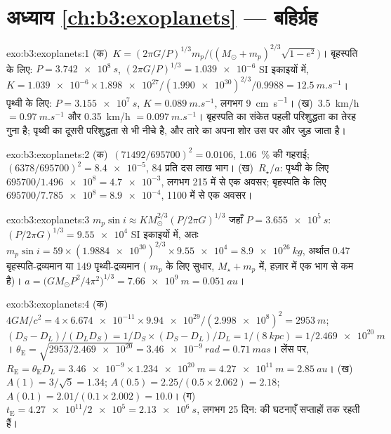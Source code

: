\section*{अध्याय \ref{ch:b3:exoplanets} --- बहिर्ग्रह}

\begin{solution}{exo:b3:exoplanets:1}
(क)~$K = (2\pi G/P)^{1/3}m_p/\bigl((M_\odot + m_p)^{2/3}\sqrt{1 - e^2}\bigr)$।
बृहस्पति के लिए: $P = \qty{3.742e8}{s}$, $(2\pi G/P)^{1/3} = \num{1.039e-6}$ SI
इकाइयों में, $K = \num{1.039e-6}\times\num{1.898e27}/(\num{1.990e30})^{2/3}/0.9988
= \qty{12.5}{m.s^{-1}}$। पृथ्वी के लिए: $P = \qty{3.155e7}{s}$, $K =
\qty{0.089}{m.s^{-1}}$, लगभग \qty{9}{cm.s^{-1}}। (ख)~\qty{3.5}{km/h} $=
\qty{0.97}{m.s^{-1}}$ और \qty{0.35}{km/h} $= \qty{0.097}{m.s^{-1}}$।
बृहस्पति का संकेत पहली परिशुद्धता का तेरह गुना है; पृथ्वी का
दूसरी परिशुद्धता से भी नीचे है, और तारे का अपना शोर उस पर और जुड़ जाता है।
\end{solution}

\begin{solution}{exo:b3:exoplanets:2}
(क)~$(71492/695700)^2 = \num{0.0106}$, \qty{1.06}{\percent} की गहराई;
$(6378/695700)^2 = \num{8.4e-5}$, 84 प्रति दस लाख भाग। (ख)~$R_\star/a$:
पृथ्वी के लिए $695700/\num{1.496e8} = \num{4.7e-3}$, लगभग 215 में से एक अवसर;
बृहस्पति के लिए $695700/\num{7.785e8} = \num{8.9e-4}$, 1100 में से एक अवसर।
\end{solution}

\begin{solution}{exo:b3:exoplanets:3}
$m_p\sin i \approx K M_\odot^{2/3}(P/2\pi G)^{1/3}$ जहाँ $P =
\qty{3.655e5}{s}$: $(P/2\pi G)^{1/3} = \num{9.55e4}$ SI इकाइयों में, अतः $m_p
\sin i = 59\times(\num{1.9884e30})^{2/3}\times\num{9.55e4} =
\qty{8.9e26}{kg}$, अर्थात 0.47 बृहस्पति-द्रव्यमान या 149 पृथ्वी-द्रव्यमान (
$m_p$ के लिए सुधार, $M_\star + m_p$ में, हज़ार में एक भाग से कम है)।
$a = \bigl(GM_\odot P^2/4\pi^2\bigr)^{1/3} = \qty{7.66e9}{m} =
\qty{0.051}{au}$।
\end{solution}

\begin{solution}{exo:b3:exoplanets:4}
(क)~$4GM/c^2 = 4\times\num{6.674e-11}\times\num{9.94e29}/(\num{2.998e8})^2 =
\qty{2953}{m}$; $(D_S - D_L)/(D_LD_S) = 1/D_S\times(D_S - D_L)/D_L =
1/(\qty{8}{kpc}) = 1/\qty{2.469e20}{m}$। $\theta_\mathrm E =
\sqrt{2953/\num{2.469e20}} = \qty{3.46e-9}{rad} = \qty{0.71}{mas}$।
लेंस पर, $R_\mathrm E = \theta_\mathrm E D_L = \num{3.46e-9}\times
\qty{1.234e20}{m} = \qty{4.27e11}{m} = \qty{2.85}{au}$। (ख)~$A(1) =
3/\sqrt5 = 1.34$; $A(0.5) = 2.25/(0.5\times2.062) = 2.18$; $A(0.1) =
2.01/(0.1\times2.002) = 10.0$। (ग)~$t_\mathrm E = \num{4.27e11}/\num{2e5}
= \qty{2.13e6}{s}$, लगभग 25 दिन:  की घटनाएँ सप्ताहों तक रहती हैं।
\end{solution}


